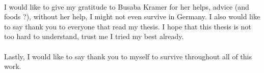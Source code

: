 \documentclass[../chapter1/thesis_msc.tex]{subfiles}
\begin{document}
\paragraph{} I would like to give my gratitude to Busaba Kramer for her helps, advice (and foods ?), without her help, I might not even survive in Germany. I also would like to say thank you to everyone that read my thesis. I hope that this thesis is not too hard to understand, trust me I tried my best already. 

\paragraph{} Lastly, I would like to say thank you to myself to survive throughout all of this work.
    \newpage
    \mbox{}
    \thispagestyle{empty}
\end{document}
